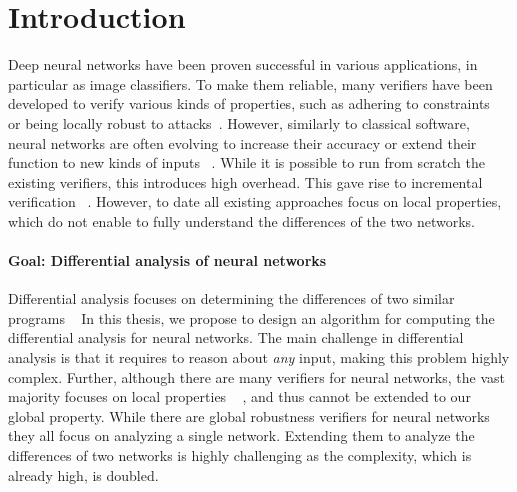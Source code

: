 
\section{Introduction}
Deep neural networks have been proven successful in various applications, in particular as image classifiers.
To make them reliable, many verifiers have been developed to verify various kinds of properties, such as adhering to constraints~\cite{Reluplex,COMPLETE,PLANET} %
or being locally robust to attacks~\cite{Reluplex,ABSTRACTINTER,NEURIPS2021_fac7fead,COMPLETE}.%
However, similarly to classical software, neural networks are often evolving to increase their accuracy or extend their function to new kinds of inputs ~\cite{SURVEY_ROBUSTNESS,INTPROP}. %
While it is possible to run from scratch the existing verifiers, this introduces high overhead.
This gave rise to incremental verification ~\cite{IVAN,INC_SEMIDEFINIT,INC_SMOOTH}.%
However, to date all existing approaches focus on local properties, which do not enable to fully understand the differences of the two networks.

\paragraph{Goal: Differential analysis of neural networks}
Differential analysis focuses on determining the differences of two similar programs ~\cite{RELUDIFF,NEURODIFF,DIFFRNN,QEBVERIF,CFXROBUSTNESS}
In this thesis, we propose to design an algorithm for computing the differential analysis for neural networks.
The main challenge in differential analysis is that it requires to reason about \emph{any} input, 
making this problem highly complex. Further, although there are many verifiers for neural networks, the vast majority focuses on local properties ~\cite{Reluplex,ABSTRACTINTER,NEURIPS2021_fac7fead,COMPLETE,CROWN}
, and thus cannot be extended to our global property.
While there are global robustness verifiers for neural networks ~\cite{Reluplex,ANOTHERGLOBALPROPERTY,MEASURENNROBCON,GLOBALPROPERTY}
they all focus on analyzing a single network. 
Extending them to analyze the differences of two networks is highly challenging as the complexity, which is already high, is doubled.

